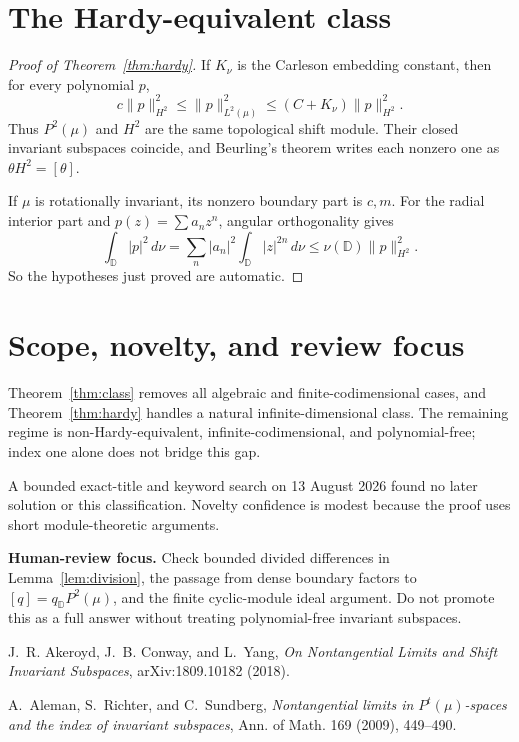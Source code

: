 \documentclass[11pt]{article}
\newcommand{\D}{\mathbb D}
\newcommand{\Hh}{P^2(\mu)}
\begin{document}
\section{The Hardy-equivalent class}

\begin{proof}[Proof of Theorem~\ref{thm:hardy}]
If $K_\nu$ is the Carleson embedding constant, then for every polynomial $p$,
\[
 c\|p\|_{H^2}^2
 \le \|p\|_{L^2(\mu)}^2
 \le (C+K_\nu)\|p\|_{H^2}^2.
\]
Thus $\Hh$ and $H^2$ are the same topological shift module.  Their closed
invariant subspaces coincide, and Beurling's theorem writes each nonzero one
as $\theta H^2=[\theta]$.

If $\mu$ is rotationally invariant, its nonzero boundary part is $c,m$.
For the radial interior part and $p(z)=\sum a_nz^n$, angular orthogonality gives
\[
 \int_{\D}|p|^2\,d\nu
 =\sum_n|a_n|^2\int_{\D}|z|^{2n}\,d\nu
 \le\nu(\D)\|p\|_{H^2}^2.
\]
So the hypotheses just proved are automatic.
\end{proof}

\section{Scope, novelty, and review focus}
\small
Theorem~\ref{thm:class} removes all algebraic and finite-codimensional cases,
and Theorem~\ref{thm:hardy} handles a natural infinite-dimensional class.  The
remaining regime is non-Hardy-equivalent, infinite-codimensional, and
polynomial-free; index one alone does not bridge this gap.

A bounded exact-title and keyword search on 13 August 2026 found no later
solution or this classification.  Novelty confidence is modest because the
proof uses short module-theoretic arguments.

\medskip\noindent\textbf{Human-review focus.}
Check bounded divided differences in Lemma~\ref{lem:division}, the passage from
dense boundary factors to $[q]=q_{\D}\Hh$, and the finite cyclic-module ideal
argument.  Do not promote this as a full answer without treating
polynomial-free invariant subspaces.

\medskip
{}\par\smallskip
\footnotesize
\noindent[1] J.~R. Akeroyd, J.~B. Conway, and L.~Yang,
\emph{On Nontangential Limits and Shift Invariant Subspaces},
arXiv:1809.10182 (2018).\par
\noindent[2] A.~Aleman, S.~Richter, and C.~Sundberg,
\emph{Nontangential limits in $P^t(\mu)$-spaces and the index of invariant
subspaces}, Ann. of Math. 169 (2009), 449--490.
\end{document}
